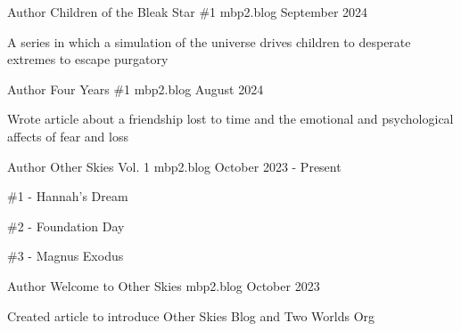 
\begin{cventries}
   \cventry
   {Author}
   {Children of the Bleak Star \#1}
   {mbp2.blog}
   {September 2024}
   {
      \begin{cvitems}
         \item {A series in which a simulation of the universe drives children to desperate extremes to escape purgatory}
      \end{cvitems}
   }
   
   \cventry
   {Author}
   {Four Years \#1}
   {mbp2.blog}
   {August 2024}
   {
      \begin{cvitems}
         \item {Wrote article about a friendship lost to time and the emotional and psychological affects of fear and loss}
      \end{cvitems}
   }
   
   \cventry
   {Author} %
   {Other Skies Vol. 1} %
   {mbp2.blog} %
   {October 2023 - Present} %
   {
      \begin{cvitems} %
         \item {\#1 - Hannah's Dream}
         \item {\#2 - Foundation Day}
         \item {\#3 - Magnus Exodus}
      \end{cvitems}
   }

   \cventry
   {Author} %
   {Welcome to Other Skies} %
   {mbp2.blog} %
   {October 2023} %
   {
      \begin{cvitems} %
         \item {Created article to introduce Other Skies Blog and Two Worlds Org}
      \end{cvitems}
   }

\end{cventries}